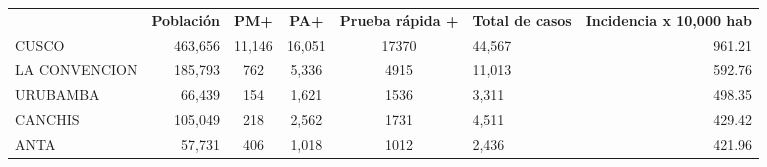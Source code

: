 \begin{tabular}{lrccclr}
	\rowcolor[HTML]{DCE6F1} 
	\multicolumn{1}{c}{\cellcolor[HTML]{DCE6F1}\textbf{PROVINCIA}} & \multicolumn{1}{c}{\cellcolor[HTML]{DCE6F1}\textbf{Población}} & \textbf{PM+}                                                & \textbf{PA+}         & \textbf{Prueba rápida +} & \multicolumn{1}{c}{\cellcolor[HTML]{DCE6F1}\textbf{Total de casos}} & \multicolumn{1}{c}{\cellcolor[HTML]{DCE6F1}\textbf{Incidencia x 10,000 hab}} \\
	\cellcolor[HTML]{FF5050}CUSCO                                  & 463,656                                                        & 11,146                                                      & 16,051               & 17370                    & 44,567                                                              & 961.21                                                                       \\
	\cellcolor[HTML]{F4B084}LA   CONVENCION                        & 185,793                                                        & 762                                                         & 5,336                & 4915                     & 11,013                                                              & 592.76                                                                       \\
	\cellcolor[HTML]{F4B084}URUBAMBA                               & 66,439                                                         & 154                                                         & 1,621                & 1536                     & 3,311                                                               & 498.35                                                                       \\
	\cellcolor[HTML]{FFE699}CANCHIS                                & 105,049                                                        & 218                                                         & 2,562                & 1731                     & 4,511                                                               & 429.42                                                                       \\
	\cellcolor[HTML]{FFE699}ANTA                                   & 57,731                                                         & 406                                                         & 1,018                & 1012                     & 2,436                                                               & 421.96                                                                       \\

\end{tabular}

